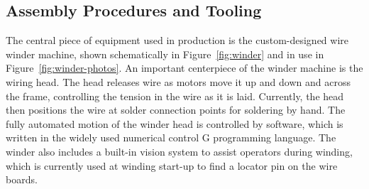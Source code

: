 \subsection{Assembly Procedures and Tooling}
\label{sec:fdsp-apa-prod-tooling}


The central piece of equipment used in  production is the custom-designed wire winder machine, shown schematically in Figure~\ref{fig:winder} and in use in Figure~\ref{fig:winder-photos}.  An important centerpiece of the winder machine is the wiring head.  The head releases wire as motors move it up and down and across the frame, controlling the tension in the wire as it is laid. Currently, the head then positions the wire at solder connection points for soldering by hand. The fully automated motion of the winder head is controlled by software, which is written in the widely used numerical control G programming language.  The winder also includes a built-in vision system to assist operators during winding, which is currently used at winding start-up to find a locator pin on the wire boards.  

